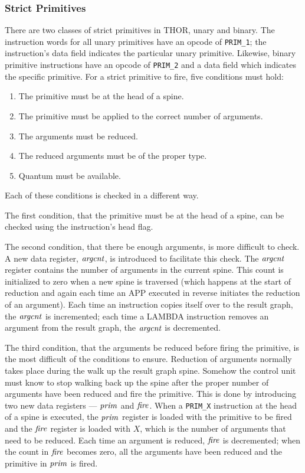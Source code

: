 
\subsubsection*{Strict Primitives}
There are two classes of strict primitives in THOR, unary and binary. The instruction
words for all unary primitives have an opcode of \texttt{PRIM\_1}; the instruction's data
field indicates the particular unary primitive. Likewise, binary primitive instructions
have an opcode of \texttt{PRIM\_2} and a data field which indicates the specific primitive.
For a strict primitive to fire, five conditions must hold:

\begin{enumerate}
\item The primitive must be at the head of a spine.

\item The primitive must be applied to the correct number of arguments.

\item The arguments must be reduced.

\item The reduced arguments must be of the proper type.

\item Quantum must be available.
\end{enumerate}

Each of these conditions is checked in a different way.

The first condition, that the primitive must be at the head of a spine, can be checked using the instruction's head flag.

The second condition, that there be enough arguments, is more difficult to check. A new
data register, \(\mathit{argcnt}\), is introduced to facilitate this check. The \(\mathit{argcnt}\)
register contains the number of arguments in the current spine. This count is initialized
to zero when a new spine is traversed (which happens at the start of reduction and again
each time an APP executed in reverse initiates the reduction of an argument). Each time an
instruction copies itself over to the result graph, the \(\mathit{argcnt}\) is incremented; each
time a LAMBDA instruction removes an argument from the result graph, the \(\mathit{argcnt}\) is
decremented.

The third condition, that the arguments be reduced before firing the primitive, is the
most difficult of the conditions to ensure. Reduction of arguments normally takes place
during the walk up the result graph spine. Somehow the control unit must know to stop
walking back up the spine after the proper number of arguments have been reduced and fire
the primitive. This is done by introducing two new data registers --- \(\mathit{prim}\) and
\(\mathit{fire}\). When a \texttt{PRIM\_X} instruction at the head of a spine is executed, the \(\mathit{prim}\)
register is loaded with the primitive to be fired and the \(\mathit{fire}\) register is loaded
with \(X\), which is the number of arguments that need to be reduced. Each time an argument
is reduced, \(\mathit{fire}\) is decremented; when the count in \(\mathit{fire}\) becomes zero, all the
arguments have been reduced and the primitive in \(\mathit{prim}\) is fired.

